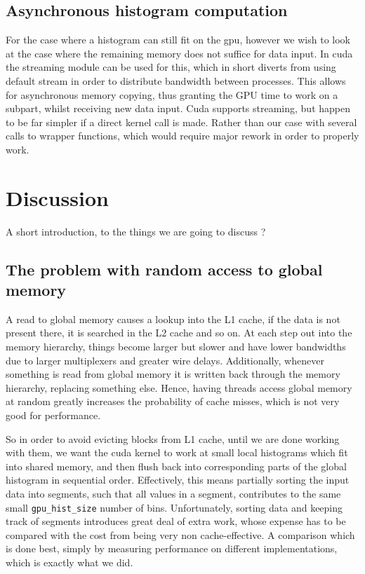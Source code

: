 \documentclass[12pt, a4paper, hidelinks]{article}
\renewcommand{\tt}[1]{\texttt{#1}}
\begin{document}
\subsection{Asynchronous histogram computation}
For the case where a histogram can still fit on the gpu, however
we wish to look at the case where the remaining memory does not suffice
for data input.
In cuda the streaming module can be used for this, which in short diverts
from using default stream in order to distribute bandwidth between processes.
This allows for asynchronous memory copying, thus granting the GPU time to
work on a subpart, whilst receiving new data input. Cuda supports streaming,
but happen to be far simpler if a direct kernel call is made. Rather than our
case with several calls to wrapper functions, which would require major
rework in order to properly work.

\section{Discussion}
A short introduction, to the things we are going to discuss ?


\subsection{The problem with random access to global memory}
A read to global memory causes a lookup into the L1 cache,
if the data is not present there, it is searched in the L2 cache and so on.
At each step out into the memory hierarchy,
things become larger but slower and have lower bandwidths due to larger
multiplexers and greater wire delays. Additionally,
whenever something is read from global memory it is written back
through the memory hierarchy, replacing something else.
Hence, having threads access global memory at random greatly
increases the probability of cache misses, which is not very good for performance.

So in order to avoid evicting blocks from L1 cache,
until we are done working with them, we want the cuda kernel to work at
small local histograms which fit into shared memory,
and then flush back into corresponding parts of the global histogram
in sequential order. Effectively, this means partially sorting the
input data into segments, such that all values in a segment,
contributes to the same small \tt{gpu\_hist\_size} number of bins.
Unfortunately, sorting data and keeping track of segments
introduces great deal of extra work, whose expense has to be compared
with the cost from being very non cache-effective.
A comparison which is done best,
simply by measuring performance on different implementations,
which is exactly what we did.
\end{document}
